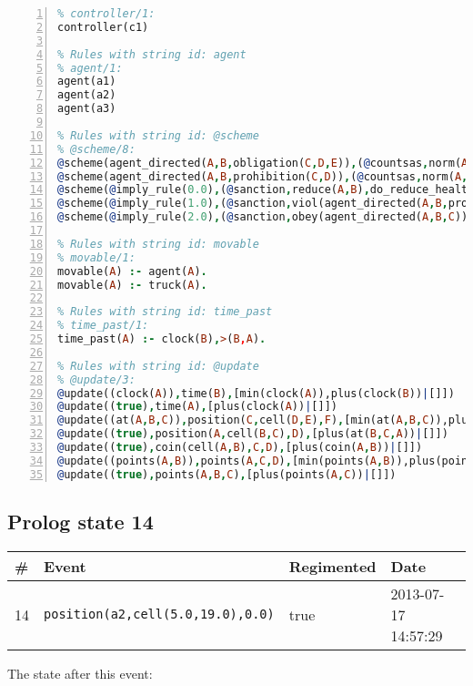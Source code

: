 \documentclass[11pt]{article}\usepackage[utf8]{inputenc}\usepackage{geometry}
\begin{document}
\begin{lstlisting}[language=Prolog, numbers=left]
% Rules with string id: controller
% controller/1:
controller(c1)

% Rules with string id: agent
% agent/1:
agent(a1)
agent(a2)
agent(a3)

% Rules with string id: @scheme
% @scheme/8:
@scheme(agent_directed(A,B,obligation(C,D,E)),(@countsas,norm(A,B,F,obligation(C,D,E)),F),false,(listTrue(C)),(time_past(D)),false,[plus(viol(agent_directed(A,B,obligation(C,D,E))))|[]],[plus(obey(agent_directed(A,B,obligation(C,D,E))))|[]])
@scheme(agent_directed(A,B,prohibition(C,D)),(@countsas,norm(A,B,E,prohibition(C,D)),E),(listTrue(C)),false,(false),false,[plus(viol(agent_directed(A,B,prohibition(C,D))))|[]],[plus(obey(agent_directed(A,B,prohibition(C,D))))|[]])
@scheme(@imply_rule(0.0),(@sanction,reduce(A,B),do_reduce_health(A,B),notifyAgent(A,changed(status))),true,false,false,false,[min(reduce(A,B))|[]],[])
@scheme(@imply_rule(1.0),(@sanction,viol(agent_directed(A,B,prohibition(C,D))),do_sanction(D)),true,false,false,false,[min(viol(agent_directed(A,B,prohibition(C,D))))|[]],[])
@scheme(@imply_rule(2.0),(@sanction,obey(agent_directed(A,B,C))),true,false,false,false,[min(obey(agent_directed(A,B,C)))|[]],[])

% Rules with string id: movable
% movable/1:
movable(A) :- agent(A).
movable(A) :- truck(A).

% Rules with string id: time_past
% time_past/1:
time_past(A) :- clock(B),>(B,A).

% Rules with string id: @update
% @update/3:
@update((clock(A)),time(B),[min(clock(A)),plus(clock(B))|[]])
@update((true),time(A),[plus(clock(A))|[]])
@update((at(A,B,C)),position(C,cell(D,E),F),[min(at(A,B,C)),plus(at(D,E,C))|[]])
@update((true),position(A,cell(B,C),D),[plus(at(B,C,A))|[]])
@update((true),coin(cell(A,B),C,D),[plus(coin(A,B))|[]])
@update((points(A,B)),points(A,C,D),[min(points(A,B)),plus(points(A,D))|[]])
@update((true),points(A,B,C),[plus(points(A,C))|[]])

\end{lstlisting}
\clearpage 
\subsection{Prolog state 14}
\begin{table}[ht]
\centering 
\begin{tabular}{l l l l} 
\textbf{\#} & \textbf{Event} & \textbf{Regimented} & \textbf{Date} \\ [0.5ex] 
\hline
14&\texttt{position(a2,cell(5.0,19.0),0.0)}&true&2013-07-17 14:57:29\\ [1ex] \hline\end{tabular}
\end{table}
The state after this event:
\end{document}
